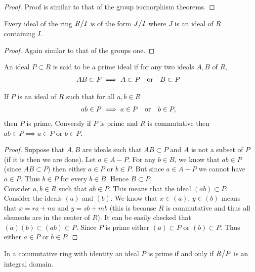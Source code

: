 \begin{proof}
  Proof is similar to that of the group isomorphism theorems.
\end{proof}
\begin{theorem}
  Every ideal of the ring $R\bign/ I$ is of the form $J\bign/I$ where $J$ is an ideal of $R$ containing $I$.
\end{theorem}
\begin{proof}
  Again similar to that of the groups one.
\end{proof}
\begin{definition}
  An ideal $P\subset R$ is said to be a prime ideal if for any two ideals $A,B$ of $R$,
  \begin{align*}
    AB \subset P \implies A\subset P \qq{or} B\subset P
  \end{align*}
\end{definition}
\begin{theorem}
  If $P$ is an ideal of $R$ such that for all $a,b\in R$
  \begin{align*}
    ab\in P \implies a\in P \qq{or} b\in P,
  \end{align*}
  then $P$ is prime. Conversly if $P$ is prime and $R$ is commutative then $ab\in P \implies a\in P$ or $b\in P$.
\end{theorem}
\begin{proof}
  Suppose that $A,B$ are ideals such that $AB\subset P$ and $A$ is not a subset of $P$ (if it is then we are done). Let $a\in A-P$. For any $b\in B$, we know that $ab\in P$ (since $AB \subset P$) then either $a\in P$ or $b\in P$. But since $a\in A-P$ we cannot have $a\in P$. Thus $b\in P$ for every $b\in B$. Hence $B\subset P$.\\

  Consider $a,b\in R$ such that $ab\in P$. This means that the ideal $(ab) \subset P$. Consider the ideals $(a)$ and $(b)$. We know that $x\in (a)$, $y\in (b)$ means that $x = ra + na$ and $y = sb + mb$ (this is because $R$ is commutative and thus all elements are in the center of $R$). It can be easily checked that $(a)(b) \subset (ab) \subset P$. Since $P$ is prime either $(a)\subset P$ or $(b)\subset P$. Thus either $a\in P$ or $b\in P$.
\end{proof}
\begin{theorem}
  In a commutative ring with identity an ideal $P$ is prime if and only if $R\bign/ P$ is an integral domain.
\end{theorem}

